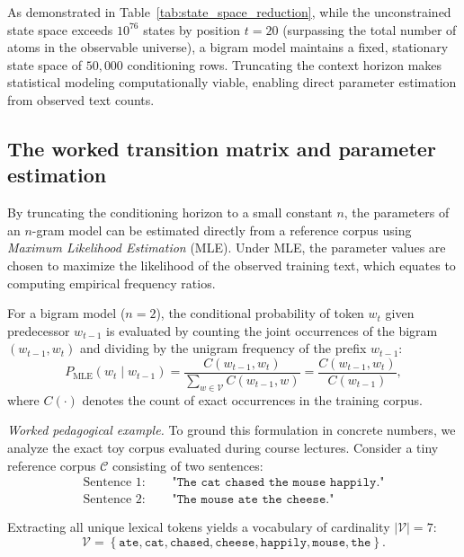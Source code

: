 \documentclass[../../main.tex]{subfiles}
\begin{document}
As demonstrated in Table~\ref{tab:state_space_reduction}, while the unconstrained state space exceeds $10^{76}$ states by position $t=20$ (surpassing the total number of atoms in the observable universe), a bigram model maintains a fixed, stationary state space of $50{,}000$ conditioning rows. Truncating the context horizon makes statistical modeling computationally viable, enabling direct parameter estimation from observed text counts.

\subsection{The worked transition matrix and parameter estimation}
\label{subsec:worked_transition_matrix}

By truncating the conditioning horizon to a small constant $n$, the parameters of an $n$-gram model can be estimated directly from a reference corpus using \textit{Maximum Likelihood Estimation} (MLE). Under MLE, the parameter values are chosen to maximize the likelihood of the observed training text, which equates to computing empirical frequency ratios.

For a bigram model ($n=2$), the conditional probability of token $w_t$ given predecessor $w_{t-1}$ is evaluated by counting the joint occurrences of the bigram $(w_{t-1}, w_t)$ and dividing by the unigram frequency of the prefix $w_{t-1}$:
\begin{equation}
P_{\text{MLE}}\left(w_t \mid w_{t-1}\right) = \frac{C\left(w_{t-1}, w_t\right)}{\sum_{w \in \mathcal{V}} C\left(w_{t-1}, w\right)} = \frac{C\left(w_{t-1}, w_t\right)}{C\left(w_{t-1}\right)},
\label{eq:mle_bigram}
\end{equation}
where $C(\cdot)$ denotes the count of exact occurrences in the training corpus.

\textit{Worked pedagogical example.} To ground this formulation in concrete numbers, we analyze the exact toy corpus evaluated during course lectures. Consider a tiny reference corpus $\mathcal{C}$ consisting of two sentences:
\begin{align}
\text{Sentence 1: } & \quad \texttt{"The cat chased the mouse happily."} \\
\text{Sentence 2: } & \quad \texttt{"The mouse ate the cheese."}
\end{align}

Extracting all unique lexical tokens yields a vocabulary of cardinality $|\mathcal{V}| = 7$:
\begin{equation}
\mathcal{V} = \left\{\texttt{ate}, \texttt{cat}, \texttt{chased}, \texttt{cheese}, \texttt{happily}, \texttt{mouse}, \texttt{the}\right\}.
\end{equation}
\end{document}
